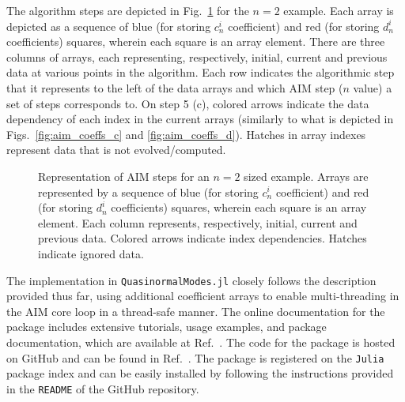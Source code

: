 %
The algorithm steps are depicted in Fig.~\ref{fig:arrays_steps} for the $n=2$ example. Each array is depicted as a sequence of blue (for storing $c^i_n$ coefficient) and red (for storing $d^i_n$ coefficients) squares, wherein each square is an array element. There are three columns of arrays, each representing, respectively, initial, current and previous data at various points in the algorithm. Each row indicates the algorithmic step that it represents to the left of the data arrays and which AIM step ($n$ value) a set of steps corresponds to. On step 5 (c), colored arrows indicate the data dependency of each index in the current arrays (similarly to what is depicted in Figs.~\ref{fig:aim_coeffs_c} and \ref{fig:aim_coeffs_d}). Hatches in array indexes represent data that is not evolved/computed.
%
\begin{figure}[!ht]
  \centering
  \fontsize{9}{10}\selectfont
  
  \caption{Representation of AIM steps for an $n=2$ sized example. Arrays are represented by a sequence of blue (for storing $c^i_n$ coefficient) and red (for storing $d^i_n$ coefficients) squares, wherein each square is an array element. Each column represents, respectively, initial, current and previous data. Colored arrows indicate index dependencies. Hatches indicate ignored data.}
  \label{fig:arrays_steps}
\end{figure}

The implementation in \texttt{QuasinormalModes.jl} closely follows the description provided thus far, using additional coefficient arrays to enable multi-threading in the AIM core loop in a thread-safe manner. The online documentation for the package includes extensive tutorials, usage examples, and package documentation, which are available at Ref.~\cite{QuasinormalModesDocs}. The code for the package is hosted on GitHub and can be found in Ref.~\cite{QuasinormalModesRepo}. The package is registered on the \texttt{Julia} package index and can be easily installed by following the instructions provided in the \texttt{README} of the GitHub repository.

